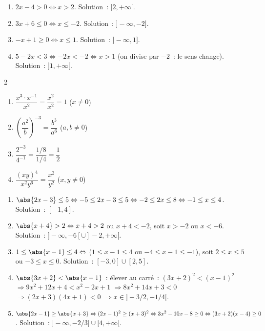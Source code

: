 \begin{enumerate}
  \item $2x-4>0\Leftrightarrow x>2$. Solution~: $]2,+\infty[$.
  \item $3x+6\leq0\Leftrightarrow x\leq-2$. Solution~: $]-\infty,-2]$.
  \item $-x+1\geq0\Leftrightarrow x\leq1$. Solution~: $]-\infty,1]$.
  \item $5-2x<3\Leftrightarrow-2x<-2\Leftrightarrow x>1$ (on divise par $-2$~: le sens change). Solution~: $]1,+\infty[$.
\end{enumerate}


\begin{multicols}{2}
\begin{enumerate}
  \item $\dfrac{x^3\cdot x^{-1}}{x^2}=\dfrac{x^2}{x^2}=1$ ($x\ne0$)
  \item $\left(\dfrac{a^2}{b}\right)^{-3}=\dfrac{b^3}{a^6}$ ($a,b\ne0$)
  \item $\dfrac{2^{-3}}{4^{-1}}=\dfrac{1/8}{1/4}=\dfrac12$
  \item $\dfrac{(xy)^4}{x^2y^6}=\dfrac{x^2}{y^2}$ ($x,y\ne0$)
\end{enumerate}
\end{multicols}


\begin{enumerate}
  \item $\abs{2x-3}\leq5\Leftrightarrow-5\leq2x-3\leq5\Leftrightarrow
        -2\leq2x\leq8\Leftrightarrow-1\leq x\leq4$.
        Solution~: $[-1,4]$.
  \item $\abs{x+4}>2\Leftrightarrow x+4>2$ ou $x+4<-2$,
        soit $x>-2$ ou $x<-6$.
        Solution~: $]-\infty,-6[\cup]-2,+\infty[$.
  \item $1\leq\abs{x-1}\leq4\Leftrightarrow$
        ($1\leq x-1\leq4$ ou $-4\leq x-1\leq-1$),
        soit $2\leq x\leq5$ ou $-3\leq x\leq0$.
        Solution~: $[-3,0]\cup[2,5]$.
  \item $\abs{3x+2}<\abs{x-1}$~: \'elever au carr\'e~:
        $(3x+2)^2<(x-1)^2$
        $\Rightarrow9x^2+12x+4<x^2-2x+1$
        $\Rightarrow8x^2+14x+3<0$
        $\Rightarrow(2x+3)(4x+1)<0$
        $\Rightarrow x\in]-3/2,-1/4[$.
  \item $\abs{2x-1}\geq\abs{x+3}\Leftrightarrow
        (2x-1)^2\geq(x+3)^2\Leftrightarrow
        3x^2-10x-8\geq0\Leftrightarrow(3x+2)(x-4)\geq0$.
        Solution~: $]-\infty,-2/3]\cup[4,+\infty[$.
\end{enumerate}


